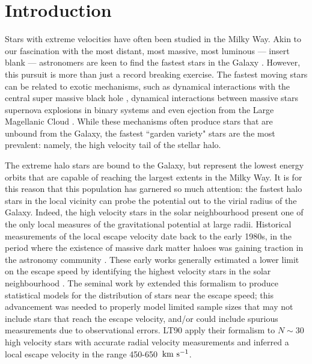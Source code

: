 \documentclass[fleqn,usenatbib]{mnras}
\newcommand{\kms}        {\,{\rm km}\,\,{\rm s}^{-1}}
\begin{document}
\section{Introduction}
Stars with extreme velocities have often been studied in the Milky Way. Akin to our fascination with the most distant, most massive, most luminous --- insert blank --- astronomers are keen to find the fastest stars in the Galaxy \citep[e.g.][]{hattori18, marchetti18, shen18}. However, this pursuit is more than just a record breaking exercise. The fastest moving stars can be related to exotic mechanisms, such as dynamical interactions with the central super massive black hole \citep[e.g.][]{hills88, yu03, brown05}, dynamical interactions between massive stars \citep[e.g.][]{poveda67, leonard90} supernova explosions in binary systems \citep[e.g.][]{blaauw61, portegies00} and even ejection from the Large Magellanic Cloud \citep[e.g.][]{boubert16}. While these mechanisms often produce stars that are unbound from the Galaxy, the fastest ``garden variety" stars are the most prevalent: namely, the high velocity tail of the stellar halo.

The extreme halo stars are bound to the Galaxy, but represent the lowest energy orbits that are capable of reaching the largest extents in the Milky Way. It is for this reason that this population has garnered so much attention: the fastest halo stars in the local vicinity can probe the potential out to the virial radius of the Galaxy.  Indeed, the high velocity stars in the solar neighbourhood present 
one of the only local measures of the gravitational potential at large radii. Historical measurements of the local escape velocity date back to the early 1980s, in the period where the existence of massive dark matter haloes was gaining traction in the astronomy community \citep[e.g.][]{faber79, rubin80}. These early works generally estimated a lower limit on the escape speed by identifying the highest velocity stars in the solar neighbourhood \citep{caldwell81, alexander82, sandage87, carney88}. The seminal work by \citet[][hereafter LT90]{lt90} extended this formalism to produce statistical models for the distribution of stars near the escape speed; this advancement was needed to properly model limited sample sizes that may not include stars that reach the escape velocity, and/or could include spurious measurements due to observational errors. LT90 apply their formalism to $N \sim 30$ high velocity stars with accurate radial velocity measurements and inferred a local escape velocity in the range 450-650 $\kms$.
\end{document}
